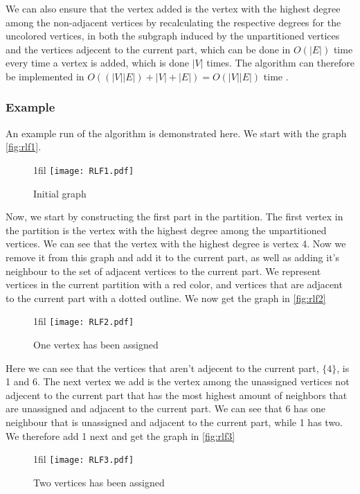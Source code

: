 \documentclass[a4paper]{article}
\makeatletter
\newcommand*{\centerfloat}{%
  \parindent \z@
  \leftskip \z@ \@plus 1fil \@minus \textwidth
  \rightskip\leftskip
  \parfillskip \z@skip}
\makeatother
\begin{document}
We can also ensure that the vertex added is the vertex with the highest degree among
the non-adjacent vertices by recalculating the respective degrees for the
uncolored vertices, in both the subgraph induced by the unpartitioned vertices and the vertices 
adjecent to the current part, which can be done in $O(|E|)$ time every time a vertex is
added, which is done $|V|$ times. The algorithm can therefore be implemented in
$O((|V||E|)+|V|+|E|) = O(|V||E|)$ time \cite{Constructive}.

\subsubsection{Example}

An example run of the algorithm is demonstrated here. We start with the graph 
\autoref{fig:rlf1}.

\begin{figure}[H]
    \centerfloat
    \texttt{[image: RLF1.pdf]}
    \caption{Initial graph}
    \label{fig:rlf1}
\end{figure}

Now, we start by constructing the first part in the partition. The first vertex
in the partition is the vertex with the highest degree among the unpartitioned
vertices. We can see that the
vertex with the highest degree is vertex 4. Now we remove it from this graph
and add it to the current part, as well as adding it's neighbour to the set
of adjacent vertices to the current part. We represent vertices in the current
partition with a red color, and vertices that are adjacent to the current part
with a dotted outline. We now get the graph in \autoref{fig:rlf2}

\begin{figure}[H]
    \centerfloat
    \texttt{[image: RLF2.pdf]}
    \caption{One vertex has been assigned}
    \label{fig:rlf2}
\end{figure}

Here we can see that the vertices that aren't adjecent to the current part,
$\{4\}$, is 1 and 6. The next vertex we add is the vertex among the unassigned
vertices not adjecent to the current part that has the
most highest amount of neighbors that are unassigned and adjacent to the current
part. We can see that 6 has one neighbour that is unassigned and adjacent to the
current part, while 1 has two. We therefore add 1 next and get the graph in
\autoref{fig:rlf3}

\begin{figure}[H]
    \centerfloat
    \texttt{[image: RLF3.pdf]}
    \caption{Two vertices has been assigned}
    \label{fig:rlf3}
\end{figure}
\end{document}
